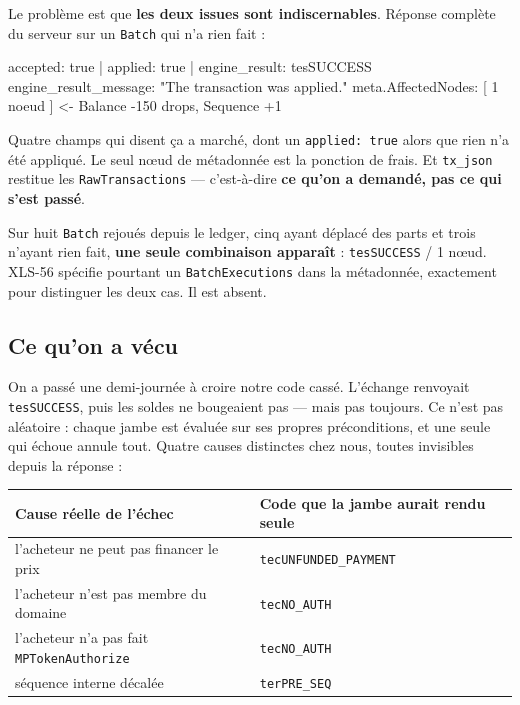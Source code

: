 \documentclass[10pt,a4paper]{article}
\newcommand{\tc}[1]{\texttt{#1}}
\begin{document}
Le problème est que \textbf{les deux issues sont indiscernables}. Réponse complète du serveur
sur un \tc{Batch} qui n'a rien fait :

\begin{code}
accepted: true | applied: true | engine_result: tesSUCCESS
engine_result_message: "The transaction was applied."
meta.AffectedNodes: [ 1 noeud ]   <- Balance -150 drops, Sequence +1
\end{code}

Quatre champs qui disent \og ça a marché\fg{}, dont un \tc{applied: true} alors que rien n'a été
appliqué. Le seul n\oe{}ud de métadonnée est la ponction de frais. Et \tc{tx\_json} restitue les
\tc{RawTransactions} --- c'est-à-dire \textbf{ce qu'on a demandé, pas ce qui s'est passé}.

Sur huit \tc{Batch} rejoués depuis le ledger, cinq ayant déplacé des parts et trois n'ayant
rien fait, \textbf{une seule combinaison apparaît} : \tc{tesSUCCESS} / 1 n\oe{}ud. XLS-56 spécifie
pourtant un \tc{BatchExecutions} dans la métadonnée, exactement pour distinguer les deux cas.
Il est absent.

\subsection{Ce qu'on a vécu}
On a passé une demi-journée à croire notre code cassé. L'échange renvoyait \tc{tesSUCCESS},
puis les soldes ne bougeaient pas --- mais pas toujours. Ce n'est pas aléatoire : chaque jambe
est évaluée sur ses propres préconditions, et une seule qui échoue annule tout. Quatre causes
distinctes chez nous, toutes invisibles depuis la réponse :

\vspace{2pt}
{\small\begin{tabularx}{\linewidth}{@{}Xl@{}}
\toprule
\textbf{Cause réelle de l'échec} & \textbf{Code que la jambe aurait rendu seule}\\
\midrule
l'acheteur ne peut pas financer le prix & \tc{tecUNFUNDED\_PAYMENT}\\
l'acheteur n'est pas membre du domaine & \tc{tecNO\_AUTH}\\
l'acheteur n'a pas fait \tc{MPTokenAuthorize} & \tc{tecNO\_AUTH}\\
séquence interne décalée & \tc{terPRE\_SEQ}\\
\bottomrule
\end{tabularx}\par}
\vspace{3pt}
\end{document}
